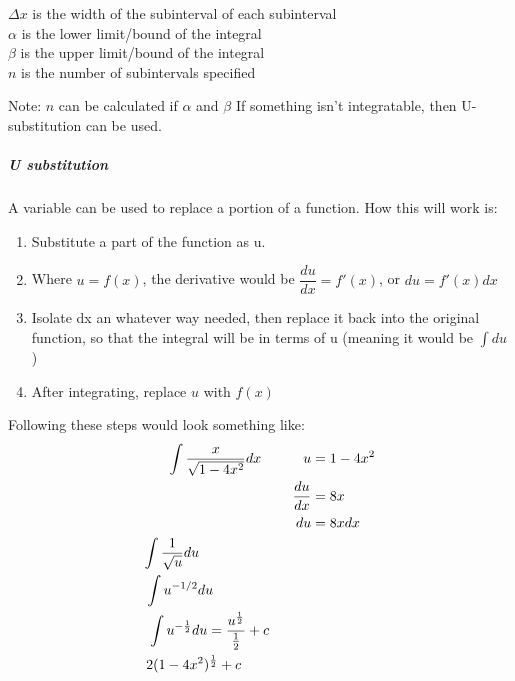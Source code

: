 \documentclass{article} %
\begin{document}
                    \begin{center}
                        $\Delta x$ is the width of the subinterval of each subinterval\\
                        $\alpha$ is the lower limit/bound of the integral\\
                        $\beta$ is the upper limit/bound of the integral\\
                        $n$ is the number of subintervals specified\\
                    \end{center}
                    Note: $n$ can be calculated if $\alpha$ and $\beta$
                    If something isn't integratable, then U-substitution can be used.
                \subparagraph{U substitution}
                    A variable can be used to replace a portion of a function. How this will work is:
                    \begin{enumerate}
                        \item Substitute a part of the function as u.
                        \item Where $u = f(x)$, the derivative would be $\dfrac{du}{dx} = f'(x)$, or $du = f'(x)dx$
                        \item Isolate dx an whatever way needed, then replace it back into the original function, so that the integral will be in terms of u (meaning it would be $\int du$)
                        \item After integrating, replace $u$ with $f(x)$
                    \end{enumerate}
                    Following these steps would look something like:
                    \begin{align*}
                        \int \dfrac{x}{\sqrt{1-4x^2}}dx \hspace{30px}
                        u &= 1-4x^2\\
                        \dfrac{du}{dx} &= 8x\\
                        du&=8xdx \\
                        \int \dfrac{1}{\sqrt{u}}du \hspace{80px}\\
                        \int u^{-1/2}du \hspace{70px}\\
                        \int u^{-\frac{1}{2}}du = \dfrac{u^{\frac{1}{2}}}{\frac{1}{2}}+c\hspace{30px}\\
                        2(1-4x^2)^{\frac{1}{2}}+c\hspace*{50px}
                    \end{align*}
\end{document}
